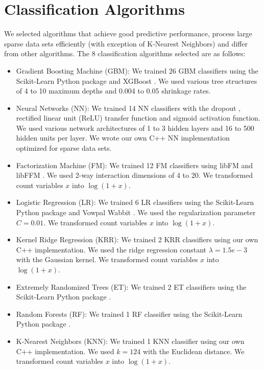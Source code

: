 \section{Classification Algorithms}
We selected algorithms that achieve good predictive performance, process large sparse data sets efficiently (with exception of K-Nearest Neighbors) and differ from other algorithms.  The 8 classification algorithms selected are as follows:
\begin{itemize}
\item Gradient Boosting Machine (GBM): We trained 26 GBM classifiers using the Scikit-Learn Python package \cite{scikit-learn} and XGBoost \cite{chen2015xgboost}.  We used various tree structures of 4 to 10 maximum depths and 0.004 to 0.05 shrinkage rates.
\item Neural Networks (NN): We trained 14 NN classifiers with the dropout \cite{srivastava2014dropout}, rectified linear unit (ReLU) \cite{dahl2013improving} transfer function and sigmoid activation function.  We used various network architectures of 1 to 3 hidden layers and 16 to 500 hidden units per layer.  We wrote our own C++ NN implementation optimized for sparse data sets.  
\item Factorization Machine (FM): We trained 12 FM classifiers using libFM \cite{rendle2012factorization} and libFFM \cite{libffm}.  We used 2-way interaction dimensions of 4 to 20.  We transformed count variables $x$ into $\log{(1 + x)}$.
\item Logistic Regression (LR): We trained 6 LR classifiers using the Scikit-Learn Python package \cite{scikit-learn} and Vowpal Wabbit \cite{langford2007vowpal}.  We used the regularization parameter $C=0.01$.  We transformed count variables $x$ into $\log{(1 + x)}$.
\item Kernel Ridge Regression (KRR): We trained 2 KRR classifiers using our own C++ implementation.  We used the ridge regression constant $\lambda=1.5e-3$ with the Gaussian kernel.  We transformed count variables $x$ into $\log{(1 + x)}$.
\item Extremely Randomized Trees (ET): We trained 2 ET classifiers using the Scikit-Learn Python package \cite{scikit-learn}.
\item Random Forests (RF): We trained 1 RF classifier using the Scikit-Learn Python package \cite{scikit-learn}.
\item K-Nearest Neighbors (KNN): We trained 1 KNN classifier using our own C++ implementation.  We used $k=124$ with the Euclidean distance.  We transformed count variables $x$ into $\log{(1 + x)}$.
\end{itemize}